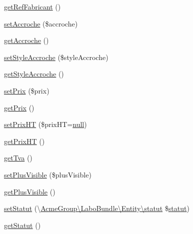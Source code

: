 \begin{DoxyCompactItemize}
\item 
\hyperlink{class_acme_group_1_1_labo_bundle_1_1_entity_1_1article_ae8e66ea183131dc828c71918c517bdf8}{get\+Ref\+Fabricant} ()
\item 
\hyperlink{class_acme_group_1_1_labo_bundle_1_1_entity_1_1article_a2795711758367e27df0b20130b8914be}{set\+Accroche} (\$accroche)
\item 
\hyperlink{class_acme_group_1_1_labo_bundle_1_1_entity_1_1article_adfd08f48a2ad4646f1539b0ed8667d7a}{get\+Accroche} ()
\item 
\hyperlink{class_acme_group_1_1_labo_bundle_1_1_entity_1_1article_a2ab93629e8044552848676fdceaf5eaf}{set\+Style\+Accroche} (\$style\+Accroche)
\item 
\hyperlink{class_acme_group_1_1_labo_bundle_1_1_entity_1_1article_ab6c0d11052a176f6cc182d3cd79660cf}{get\+Style\+Accroche} ()
\item 
\hyperlink{class_acme_group_1_1_labo_bundle_1_1_entity_1_1article_a58c99e76c4bae953f0e626108bade184}{set\+Prix} (\$prix)
\item 
\hyperlink{class_acme_group_1_1_labo_bundle_1_1_entity_1_1article_a9ba25d819f3b0f549a31896560851e8c}{get\+Prix} ()
\item 
\hyperlink{class_acme_group_1_1_labo_bundle_1_1_entity_1_1article_a9f172efd55baecd1734fdb9232436261}{set\+Prix\+H\+T} (\$prix\+H\+T=\hyperlink{validate_8js_afb8e110345c45e74478894341ab6b28e}{null})
\item 
\hyperlink{class_acme_group_1_1_labo_bundle_1_1_entity_1_1article_ace657c92bca9bd4db9526f9e1a06ba8d}{get\+Prix\+H\+T} ()
\item 
\hyperlink{class_acme_group_1_1_labo_bundle_1_1_entity_1_1article_abe410c62d3dee9c6d71e85aeadbc193b}{get\+Tva} ()
\item 
\hyperlink{class_acme_group_1_1_labo_bundle_1_1_entity_1_1article_a024acd9f4765de40d04a050ffd189210}{set\+Plus\+Visible} (\$plus\+Visible)
\item 
\hyperlink{class_acme_group_1_1_labo_bundle_1_1_entity_1_1article_a02fc6023a4ea797f86aadb4d875af0f6}{get\+Plus\+Visible} ()
\item 
\hyperlink{class_acme_group_1_1_labo_bundle_1_1_entity_1_1article_a648dc119a628c3ba637e090f2cb37c9d}{set\+Statut} (\textbackslash{}\hyperlink{class_acme_group_1_1_labo_bundle_1_1_entity_1_1statut}{Acme\+Group\textbackslash{}\+Labo\+Bundle\textbackslash{}\+Entity\textbackslash{}statut} \$\hyperlink{class_acme_group_1_1_labo_bundle_1_1_entity_1_1statut}{statut})
\item 
\hyperlink{class_acme_group_1_1_labo_bundle_1_1_entity_1_1article_a404bfa9004d4412fe5bc5ce200dafdc2}{get\+Statut} ()

\end{DoxyCompactItemize}
